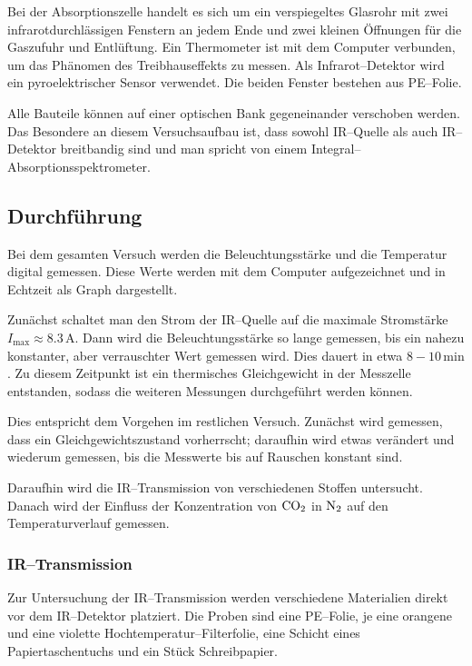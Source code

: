 \documentclass[12pt,a4paper]{scrartcl}
\numberwithin{equation}{section} %
\begin{document}
Bei der Absorptionszelle handelt es sich um ein verspiegeltes Glasrohr mit zwei infrarotdurchlässigen Fenstern an jedem Ende und zwei kleinen Öffnungen für die Gaszufuhr und Entlüftung. Ein Thermometer ist mit dem Computer verbunden, um das Phänomen des Treibhauseffekts zu messen. Als Infrarot--Detektor wird ein pyroelektrischer Sensor verwendet. Die beiden Fenster bestehen aus PE--Folie.

Alle Bauteile können auf einer optischen Bank gegeneinander verschoben werden. Das Besondere an diesem Versuchsaufbau ist, dass sowohl IR--Quelle als auch IR--Detektor breitbandig sind und man spricht von einem Integral--Absorptionsspektrometer.

\subsection{Durchführung}
\label{durchfuehrung}
Bei dem gesamten Versuch werden die Beleuchtungsstärke und die Temperatur digital gemessen. Diese Werte werden mit dem Computer aufgezeichnet und in Echtzeit als Graph dargestellt.

Zunächst schaltet man den Strom der IR--Quelle auf die maximale Stromstärke $I_\mathrm{max}\approx 8.3\mathrm{\,A}$. Dann wird die Beleuchtungsstärke so lange gemessen, bis ein nahezu konstanter, aber verrauschter Wert gemessen wird. Dies dauert in etwa $8-10\mathrm{\,min}$. Zu diesem Zeitpunkt ist ein thermisches Gleichgewicht in der Messzelle entstanden, sodass die weiteren Messungen durchgeführt werden können.

Dies entspricht dem Vorgehen im restlichen Versuch. Zunächst wird gemessen, dass ein Gleichgewichtszustand vorherrscht; daraufhin wird etwas verändert und wiederum gemessen, bis die Messwerte bis auf Rauschen konstant sind.

Daraufhin wird die IR--Transmission von verschiedenen Stoffen untersucht. Danach wird der Einfluss der Konzentration von $\ce{CO_2}$ in $\ce{N_2}$ auf den Temperaturverlauf gemessen.

\subsubsection{IR--Transmission}
\label{howto:IR--Transmission}

Zur Untersuchung der IR--Transmission werden verschiedene Materialien direkt vor dem IR--Detektor platziert. Die Proben sind eine PE--Folie, je eine orangene und eine violette Hochtemperatur--Filterfolie, eine Schicht eines Papiertaschentuchs und ein Stück Schreibpapier.
\end{document}
